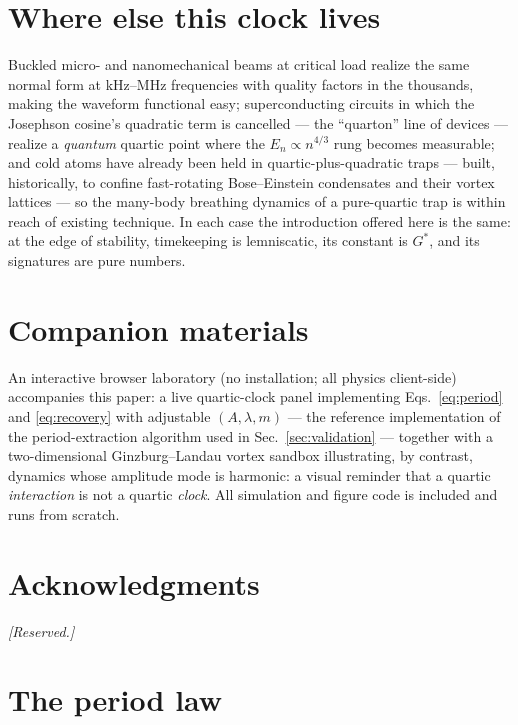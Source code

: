 \documentclass[11pt,a4paper]{article}
\newcommand{\Gstar}{{G^{*}}}
\begin{document}
\section{Where else this clock lives}
\label{sec:platforms}

Buckled micro- and nanomechanical beams at critical load realize the same
normal form at kHz--MHz frequencies with quality factors in the thousands,
making the waveform functional easy; superconducting circuits in which the
Josephson cosine's quadratic term is cancelled --- the ``quarton'' line of
devices \cite{quarton} --- realize a \emph{quantum} quartic point where the
$E_n\propto n^{4/3}$ rung becomes measurable; and cold atoms have already
been held in quartic-plus-quadratic traps --- built, historically, to
confine fast-rotating Bose--Einstein condensates and their vortex lattices
\cite{bretin} --- so the many-body breathing dynamics of a pure-quartic trap
is within reach of existing technique. In each case the introduction offered
here is the same: at the edge of stability, timekeeping is lemniscatic, its
constant is $\Gstar$, and its signatures are pure numbers.

\section*{Companion materials}

An interactive browser laboratory (no installation; all physics
client-side) accompanies this paper: a live quartic-clock panel implementing
Eqs.~\eqref{eq:period} and \eqref{eq:recovery} with adjustable $(A,\lambda,m)$
--- the reference implementation of the period-extraction algorithm used in
Sec.~\ref{sec:validation} --- together with a two-dimensional
Ginzburg--Landau vortex sandbox illustrating, by contrast, dynamics whose
amplitude mode is harmonic: a visual reminder that a quartic \emph{interaction}
is not a quartic \emph{clock}. All simulation and figure code is included and
runs from scratch.

\section*{Acknowledgments}
\emph{[Reserved.]}

\appendix

\section{The period law}
\label{app:period}
\end{document}
